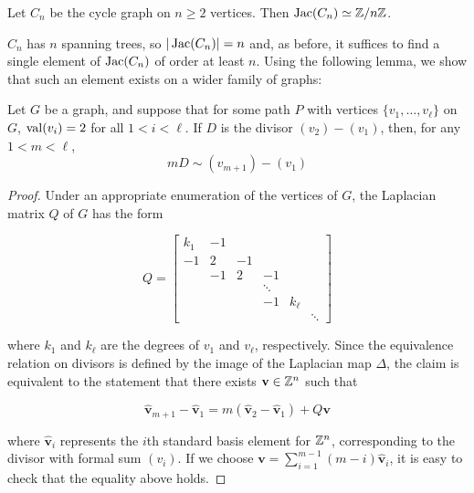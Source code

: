 \documentclass{amsart}
\newcommand{\bv}[1]{\widehat{\mathbf{#1}}}
\begin{document}
\begin{prop}
  \label{prop:cycle_cyclic}
  Let $C_n$ be the cycle graph on $n \ge 2$ vertices. Then $\operatorname{Jac}(C_n) \simeq
  \mathbb{Z}/n\mathbb{Z}$.
\end{prop}

$C_n$ has $n$ spanning trees, so $|\operatorname{Jac}(C_n)|=n$ and, as before, it
suffices to find a single element of $\operatorname{Jac}(C_n)$ of order at least
$n$. Using the following lemma, we show that such an element exists on
a wider family of graphs:

\begin{lem}
  \label{lem:2valent_path}
  Let $G$ be a graph, and suppose that for some path $P$ with vertices
  $\{v_1, \ldots, v_\ell\}$ on $G$, $\operatorname{val}(v_i) = 2$ for all $1 < i <
  \ell$. If $D$ is the divisor $(v_2) - (v_1)$, then, for any $1 < m <
  \ell$,
  \begin{equation*}
    mD \sim (v_{m+1}) - (v_1)
  \end{equation*}
\end{lem}
\begin{proof}
  Under an appropriate enumeration of the vertices of $G$, the
  Laplacian matrix $Q$ of $G$ has the form

  $$Q = \begin{bmatrix}
    k_1 & -1 \\
    -1 &  2 & -1 \\
    & -1 &  2 & -1 \\
    &    &    &  \ddots  \\
    &    &    &  -1 & k_\ell \\ 
    &    &    &     &    & \ddots
  \end{bmatrix}$$

  where $k_1$ and $k_\ell$ are the degrees of $v_1$ and $v_\ell$,
  respectively. Since the equivalence relation on divisors is defined
  by the image of the Laplacian map $\Delta$, the claim is equivalent
  to the statement that there exists $\mathbf{v} \in \mathbb{Z}^n$ such that

  \begin{equation*}
    \bv{v}_{m+1} - \bv{v}_1  = m(\bv{v}_2 - \bv{v}_1) + Q\mathbf{v}
  \end{equation*}

  where $\bv{v}_i$ represents the $i$th standard basis element for
  $\mathbb{Z}^n$, corresponding to the divisor with formal sum $(v_i)$. If we
  choose $\mathbf{v} = \sum_{i=1}^{m - 1}(m - i)\bv{v}_i$, it is
  easy to check that the equality above holds.
\end{proof}
\end{document}
